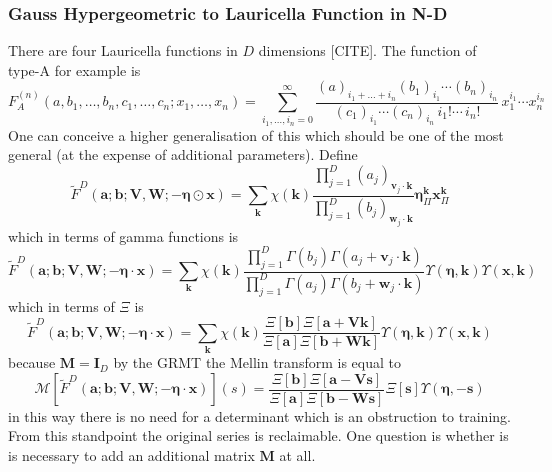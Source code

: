 \documentclass{article}
\begin{document}
\subsubsection{Gauss Hypergeometric to Lauricella Function in N-D}
There are four Lauricella functions in $D$ dimensions [CITE]. The function of type-A for example is
\begin{equation}
F_A^{(n)}(a, b_1,\ldots,b_n, c_1,\ldots,c_n; x_1,\ldots,x_n) = 
\sum_{i_1,\ldots,i_n=0}^{\infty} \frac{(a)_{i_1+\ldots+i_n} (b_1)_{i_1} \cdots (b_n)_{i_n}} {(c_1)_{i_1} \cdots (c_n)_{i_n} \,i_1! \cdots \,i_n!} \,x_1^{i_1} \cdots x_n^{i_n}
\end{equation}
One can conceive a higher generalisation of this which should be one of the most general (at the expense of additional parameters). Define
\begin{equation}
\tilde{F}^{D}(\mathbf{a};\mathbf{b};\mathbf{V,W};-\boldsymbol\eta \odot\mathbf{x}) = \sum_{\mathbf{k}} \chi(\mathbf{k})\frac{\prod_{j=1}^D (a_j)_{\mathbf{v}_j \cdot \mathbf{k}}}{\prod_{j=1}^D (b_j)_{\mathbf{w}_j \cdot \mathbf{k}}} \boldsymbol\eta^{\mathbf{k}}_\Pi\mathbf{x}^{\mathbf{k}}_\Pi
\end{equation}
which in terms of gamma functions is 
\begin{equation}
\tilde{F}^{D}(\mathbf{a};\mathbf{b};\mathbf{V,W};-\boldsymbol\eta \cdot\mathbf{x}) = \sum_{\mathbf{k}} \chi(\mathbf{k})\frac{\prod_{j=1}^D \Gamma(b_j)\Gamma(a_j + \mathbf{v}_j\cdot \mathbf{k})}{\prod_{j=1}^D \Gamma(a_j)\Gamma(b_j+\mathbf{w}_j\cdot \mathbf{k})} \Upsilon(\boldsymbol\eta,\mathbf{k})\Upsilon(\mathbf{x},\mathbf{k})
\end{equation}
which in terms of $\Xi$ is
\begin{equation}
\tilde{F}^{D}(\mathbf{a};\mathbf{b};\mathbf{V,W};-\boldsymbol\eta \cdot\mathbf{x}) = \sum_{\mathbf{k}} \chi(\mathbf{k})\frac{\Xi[\mathbf{b}]\Xi[\mathbf{a}+\mathbf{Vk}]}{\Xi[\mathbf{a}]\Xi[\mathbf{b+Wk}]} \Upsilon(\boldsymbol\eta,\mathbf{k})\Upsilon(\mathbf{x},\mathbf{k})
\end{equation}
because $\mathbf{M}=\mathbf{I}_D$ by the GRMT the Mellin transform is equal to \begin{equation}
\mathcal{M}[\tilde{F}^{D}(\mathbf{a};\mathbf{b};\mathbf{V,W};-\boldsymbol\eta \cdot\mathbf{x})](s) = \frac{\Xi[\mathbf{b}]\Xi[\mathbf{a}-\mathbf{Vs}]}{\Xi[\mathbf{a}]\Xi[\mathbf{b-Ws}]}\Xi[\mathbf{s}]\Upsilon(\boldsymbol\eta,-\mathbf{s})
\end{equation}
in this way there is no need for a determinant which is an obstruction to training. From this standpoint the original series is reclaimable. One question is whether is is necessary to add an additional matrix $\mathbf{M}$ at all.
\end{document}
